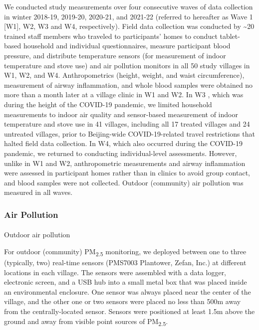 \documentclass[
  letterpaper,
  DIV=11,
  numbers=noendperiod]{scrartcl}
\makeatletter
\let\oldparagraph\paragraph
\renewcommand{\paragraph}{
    \@ifstar
      \xxxParagraphStar
      \xxxParagraphNoStar
  }
\newcommand{\xxxParagraphStar}[1]{\oldparagraph*{#1}\mbox{}}
\newcommand{\xxxParagraphNoStar}[1]{\oldparagraph{#1}\mbox{}}
\makeatother
\begin{document}
We conducted study measurements over four consecutive waves of data
collection in winter 2018-19, 2019-20, 2020-21, and 2021-22 (referred to
hereafter as Wave 1 {[}W1{]}, W2, W3 and W4, respectively). Field data
collection was conducted by \textasciitilde20 trained staff members who
traveled to participants' homes to conduct tablet-based household and
individual questionnaires, measure participant blood pressure, and
distribute temperature sensors (for measurement of indoor temperature
and stove use) and air pollution monitors in all 50 study villages in
W1, W2, and W4. Anthropometrics (height, weight, and waist
circumference), measurement of airway inflammation, and whole blood
samples were obtained no more than a month later at a village clinic in
W1 and W2. In W3 , which was during the height of the
COVID-19 pandemic, we limited household measurements to indoor air
quality and sensor-based measurement of indoor temperature and stove use
in 41 villages, including all 17 treated villages and 24 untreated
villages, prior to Beijing-wide COVID-19-related travel restrictions
that halted field data collection. In W4, which also occurred during the
COVID-19 pandemic, we returned to conducting individual-level
assessments. However, unlike in W1 and W2, anthropometric measurements
and airway inflammation were assessed in participant homes rather than
in clinics to avoid group contact, and blood samples were not collected.
Outdoor (community) air pollution was measured in all waves.

\subsubsection{Air Pollution}\label{air-pollution}

\paragraph{Outdoor air pollution}\label{outdoor-air-pollution}

For outdoor (community) PM\textsubscript{2.5} monitoring, we deployed
between one to three (typically, two) real-time sensors (PMS7003
 Plantower, Zefan, Inc.) at different locations in each
village. The sensors were assembled with a data logger, electronic
screen, and a USB hub into a small metal box that was placed inside an
environmental enclosure. One sensor was always placed near the center of
the village, and the other one or two sensors were placed no less than
500m away from the centrally-located sensor. Sensors were positioned at
least 1.5m above the ground and away from visible point sources of
PM\textsubscript{2.5}.
\end{document}
